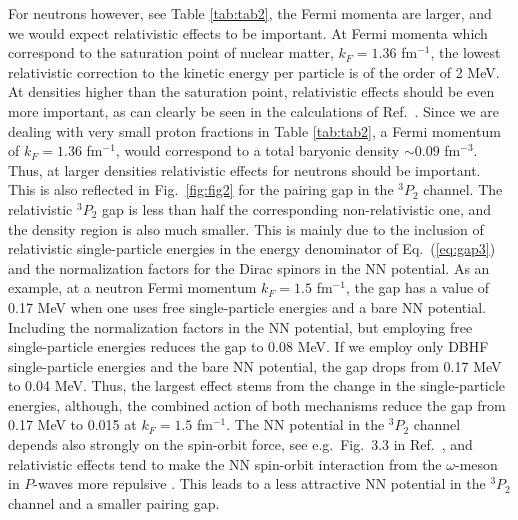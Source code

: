For neutrons however, see Table \ref{tab:tab2},
the Fermi momenta are larger, and we would 
expect relativistic effects to be important. At Fermi momenta
which correspond to the
saturation point of nuclear matter, $k_F=1.36$ fm$^{-1}$,
the lowest relativistic correction to the kinetic energy per 
particle is of the order of 2 MeV. At densities higher than the saturation
point, relativistic effects should be even more important, as can clearly
be seen in the calculations of Ref.\ \cite{bm90}. 
Since we are dealing with
very small proton fractions in Table \ref{tab:tab2}, 
a Fermi momentum
of $k_F=1.36$ fm$^{-1}$, would correspond to a total baryonic 
density $\sim 0.09$  fm$^{-3}$. Thus, at larger densities 
relativistic effects for neutrons should
be important.
This is also reflected in Fig.\ \ref{fig:fig2} for the pairing
gap in the $^3P_2$ channel.
The relativistic $^3P_2$ gap is less  than half
the corresponding non-relativistic one, and the 
density region is also much smaller. This is mainly due to the 
inclusion of relativistic single-particle energies in the 
energy denominator of Eq.\ (\ref{eq:gap3}) and the normalization
factors for the Dirac spinors in the NN potential. As an example,
at a neutron Fermi momentum $k_F=1.5$ fm$^{-1}$, the gap has 
a value of 0.17 MeV when one uses free single-particle energies 
and a bare NN  potential. Including the normalization
factors in the NN potential, but employing free single-particle 
energies reduces the gap to 0.08 MeV.
If we employ only DBHF single-particle energies and the bare
NN potential, the gap drops from 0.17 MeV to 0.04 MeV. 
Thus,
the largest effect stems from the 
change in the single-particle energies, although, the combined action 
of both mechanisms reduce the gap from 0.17 MeV to 0.015 at
$k_F=1.5$ fm$^{-1}$. The NN potential in the 
$^3P_2$ channel depends also strongly on the 
spin-orbit force, see e.g.\ Fig.\ 3.3 in Ref.\ \cite{mac89}, 
and relativistic
effects tend to make the NN spin-orbit interaction from the 
$\omega$-meson in $P$-waves more repulsive \cite{mac89}. This leads
to a less attractive NN potential in the  $^3P_2$ channel and a smaller
pairing gap.


